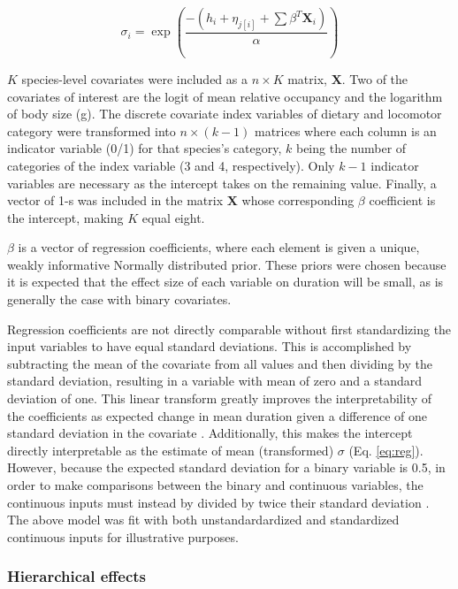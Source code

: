 \documentclass[12pt,letterpaper]{article}
\begin{document}
\begin{equation}
  \sigma_{i} = \exp\left(\frac{-(h_{i} + \eta_{j[i]} + \sum \beta^{T} \mathbf{X}_{i})}{\alpha}\right)
  \label{eq:reg_ext}
\end{equation}

\(K\) species-level covariates were included as a \(n \times K\) matrix, \(\mathbf{X}\). Two of the covariates of interest are the logit of mean relative occupancy and the logarithm of body size (g). The discrete covariate index variables of dietary and locomotor category were transformed into \(n \times (k - 1)\) matrices where each column is an indicator variable (0/1) for that species's category, \(k\) being the number of categories of the index variable (3 and 4, respectively). Only \(k - 1\) indicator variables are necessary as the intercept takes on the remaining value. Finally, a vector of 1-s was included in the matrix \(\mathbf{X}\) whose corresponding \(\beta\) coefficient is the intercept, making \(K\) equal eight.

\(\beta\) is a vector of regression coefficients, where each element is given a unique, weakly informative Normally distributed prior. These priors were chosen because it is expected that the effect size of each variable on duration will be small, as is generally the case with binary covariates. %

Regression coefficients are not directly comparable without first standardizing the input variables to have equal standard deviations. This is accomplished by subtracting the mean of the covariate from all values and then dividing by the standard deviation, resulting in a variable with mean of zero and a standard deviation of one. This linear transform greatly improves the interpretability of the coefficients as expected change in mean duration given a difference of one standard deviation in the covariate \citep{Schielzeth2010}. Additionally, this makes the intercept directly interpretable as the estimate of mean (transformed) \(\sigma\) (Eq. \ref{eq:reg}). However, because the expected standard deviation for a binary variable is 0.5, in order to make comparisons between the binary and continuous variables, the continuous inputs must instead by divided by twice their standard deviation \citep{Gelman2008}. The above model was fit with both unstandardardized and standardized continuous inputs for illustrative purposes.


\subsubsection{Hierarchical effects}
\end{document}
